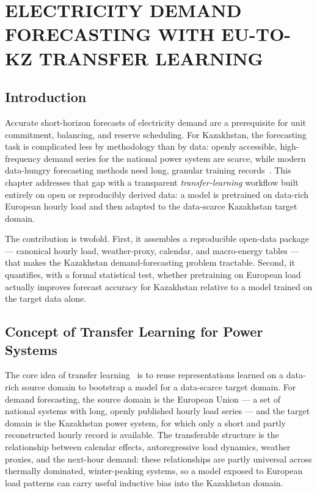 
\chapter{ELECTRICITY DEMAND FORECASTING WITH EU-TO-KZ TRANSFER LEARNING}
\label{ch:ml_forecasting}

\section{Introduction}
\label{sec:ml_intro}

Accurate short-horizon forecasts of electricity demand are a prerequisite for unit commitment, balancing, and reserve scheduling. For Kazakhstan, the forecasting task is complicated less by methodology than by data: openly accessible, high-frequency demand series for the national power system are scarce, while modern data-hungry forecasting methods need long, granular training records~\cite{hewamalage2021, makridakis2018}. This chapter addresses that gap with a transparent \emph{transfer-learning} workflow built entirely on open or reproducibly derived data: a model is pretrained on data-rich European hourly load and then adapted to the data-scarce Kazakhstan target domain.

The contribution is twofold. First, it assembles a reproducible open-data package --- canonical hourly load, weather-proxy, calendar, and macro-energy tables --- that makes the Kazakhstan demand-forecasting problem tractable. Second, it quantifies, with a formal statistical test, whether pretraining on European load actually improves forecast accuracy for Kazakhstan relative to a model trained on the target data alone.

\section{Concept of Transfer Learning for Power Systems}
\label{sec:ml_transfer}

The core idea of transfer learning~\cite{pan2010transfer} is to reuse representations learned on a data-rich source domain to bootstrap a model for a data-scarce target domain. For demand forecasting, the source domain is the European Union --- a set of national systems with long, openly published hourly load series --- and the target domain is the Kazakhstan power system, for which only a short and partly reconstructed hourly record is available. The transferable structure is the relationship between calendar effects, autoregressive load dynamics, weather proxies, and the next-hour demand: these relationships are partly universal across thermally dominated, winter-peaking systems, so a model exposed to European load patterns can carry useful inductive bias into the Kazakhstan domain.

